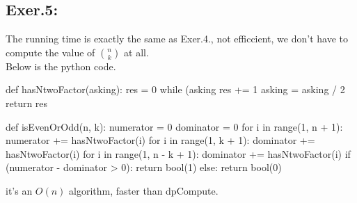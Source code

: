 \documentclass[UTF8]{ctexart}
\begin{document}
\subsection*{Exer.5:}
The running time is exactly the same as Exer.4.,
not efficcient, we don't have to compute the value of $\binom n k$ at all.\\
Below is the python code.
\begin{python}
def hasNtwoFactor(asking):
    res = 0
    while (asking %
        res += 1
        asking = asking / 2
    return res

def isEvenOrOdd(n, k):
    numerator = 0
    dominator = 0
    for i in range(1, n + 1):
        numerator += hasNtwoFactor(i)
    for i in range(1, k + 1):
        dominator += hasNtwoFactor(i)
    for i in range(1, n - k + 1):
        dominator += hasNtwoFactor(i)
    if (numerator - dominator > 0):
        return bool(1)
    else:
        return bool(0)
\end{python}
it's an $O(n)$ algorithm, faster than dpCompute.
\end{document}
